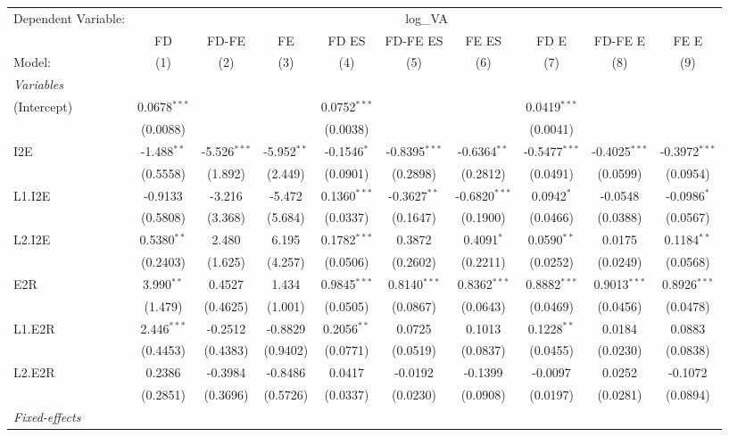 \begin{tabular}{lccccccccc}
Dependent Variable:&\multicolumn{9}{c}{log\_VA}\\
  & FD & FD-FE & FE & FD ES & FD-FE ES & FE ES & FD E & FD-FE E & FE E\\
Model:&(1) & (2) & (3) & (4) & (5) & (6) & (7) & (8) & (9)\\
\midrule \emph{Variables}&   &   &   &   &   &   &   &   &  \\
(Intercept)&0.0678$^{***}$ &    &    & 0.0752$^{***}$ &    &    & 0.0419$^{***}$ &    &   \\
  &(0.0088) &    &    & (0.0038) &    &    & (0.0041) &    &   \\
I2E&-1.488$^{**}$ & -5.526$^{***}$ & -5.952$^{**}$ & -0.1546$^{*}$ & -0.8395$^{***}$ & -0.6364$^{**}$ & -0.5477$^{***}$ & -0.4025$^{***}$ & -0.3972$^{***}$\\
  &(0.5558) & (1.892) & (2.449) & (0.0901) & (0.2898) & (0.2812) & (0.0491) & (0.0599) & (0.0954)\\
L1.I2E&-0.9133 & -3.216 & -5.472 & 0.1360$^{***}$ & -0.3627$^{**}$ & -0.6820$^{***}$ & 0.0942$^{*}$ & -0.0548 & -0.0986$^{*}$\\
  &(0.5808) & (3.368) & (5.684) & (0.0337) & (0.1647) & (0.1900) & (0.0466) & (0.0388) & (0.0567)\\
L2.I2E&0.5380$^{**}$ & 2.480 & 6.195 & 0.1782$^{***}$ & 0.3872 & 0.4091$^{*}$ & 0.0590$^{**}$ & 0.0175 & 0.1184$^{**}$\\
  &(0.2403) & (1.625) & (4.257) & (0.0506) & (0.2602) & (0.2211) & (0.0252) & (0.0249) & (0.0568)\\
E2R&3.990$^{**}$ & 0.4527 & 1.434 & 0.9845$^{***}$ & 0.8140$^{***}$ & 0.8362$^{***}$ & 0.8882$^{***}$ & 0.9013$^{***}$ & 0.8926$^{***}$\\
  &(1.479) & (0.4625) & (1.001) & (0.0505) & (0.0867) & (0.0643) & (0.0469) & (0.0456) & (0.0478)\\
L1.E2R&2.446$^{***}$ & -0.2512 & -0.8829 & 0.2056$^{**}$ & 0.0725 & 0.1013 & 0.1228$^{**}$ & 0.0184 & 0.0883\\
  &(0.4453) & (0.4383) & (0.9402) & (0.0771) & (0.0519) & (0.0837) & (0.0455) & (0.0230) & (0.0838)\\
L2.E2R&0.2386 & -0.3984 & -0.8486 & 0.0417 & -0.0192 & -0.1399 & -0.0097 & 0.0252 & -0.1072\\
  &(0.2851) & (0.3696) & (0.5726) & (0.0337) & (0.0230) & (0.0908) & (0.0197) & (0.0281) & (0.0894)\\
\midrule \emph{Fixed-effects}&   &   &   &   &   &   &   &   &  \\

\end{tabular}
